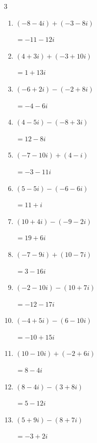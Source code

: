 \begin{multicols}{3}
\begin{enumerate}
        $\displaystyle =-8+11i$

  \item $\displaystyle (-8-4i) + (-3-8i)$

        $\displaystyle =-11-12i$

  \item $\displaystyle (4+3i) + (-3+10i)$

        $\displaystyle =1+13i$

  \item $\displaystyle (-6+2i) - (-2+8i)$

        $\displaystyle =-4-6i$

  \item $\displaystyle (4-5i) - (-8+3i)$

        $\displaystyle =12-8i$

  \item $\displaystyle (-7-10i) + (4-i)$

        $\displaystyle =-3-11i$

\columnbreak %

  \item $\displaystyle (5-5i) - (-6-6i)$

        $\displaystyle =11+i$

  \item $\displaystyle (10+4i) - (-9-2i)$

        $\displaystyle =19+6i$

  \item $\displaystyle (-7-9i) + (10-7i)$

        $\displaystyle =3-16i$

  \item $\displaystyle (-2-10i) - (10+7i)$

        $\displaystyle =-12-17i$

  \item $\displaystyle (-4+5i) - (6-10i)$

        $\displaystyle =-10+15i$

  \item $\displaystyle (10-10i) + (-2+6i)$

        $\displaystyle =8-4i$

  \item $\displaystyle (8-4i) - (3+8i)$

        $\displaystyle =5-12i$

  \item $\displaystyle (5+9i) - (8+7i)$

        $\displaystyle =-3+2i$


\end{enumerate}
\end{multicols}
